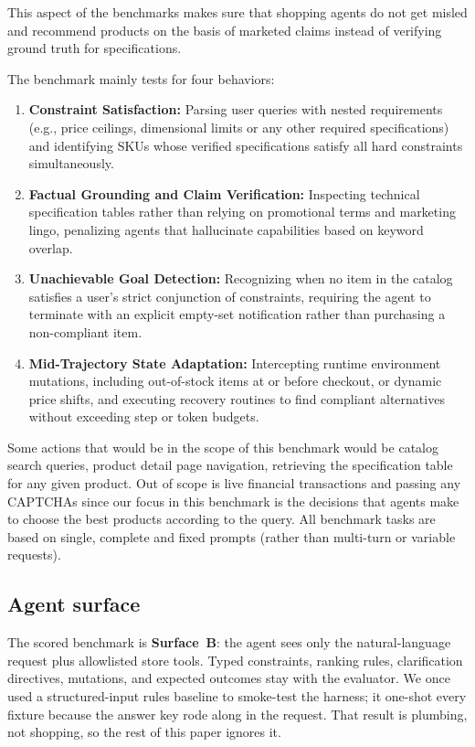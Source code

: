 \documentclass{article} %
\begin{document}
This aspect of the benchmarks makes sure that shopping agents do not get misled and recommend products on the basis of marketed claims instead of verifying ground truth for specifications. 

The benchmark mainly tests for four behaviors: 
\begin{enumerate}[leftmargin=*,noitemsep,topsep=0pt]
    \item \textbf{Constraint Satisfaction:} Parsing user queries with nested requirements (e.g., price ceilings, dimensional limits or any other required specifications) and identifying SKUs whose verified specifications satisfy all hard constraints simultaneously.
    \item \textbf{Factual Grounding and Claim Verification:} Inspecting technical specification tables rather than relying on promotional terms and marketing lingo, penalizing agents that hallucinate capabilities based on keyword overlap.
    \item \textbf{Unachievable Goal Detection:} Recognizing when no item in the catalog satisfies a user's strict conjunction of constraints, requiring the agent to terminate with an explicit empty-set notification rather than purchasing a non-compliant item.
    \item \textbf{Mid-Trajectory State Adaptation:} Intercepting runtime environment mutations, including out-of-stock items at or before checkout, or dynamic price shifts, and executing recovery routines to find compliant alternatives without exceeding step or token budgets.
\end{enumerate}

Some actions that would be in the scope of this benchmark would be catalog search queries, product detail page navigation, retrieving the specification table for any given product. Out of scope is live financial transactions and passing any CAPTCHAs since our focus in this benchmark is the decisions that agents make to choose the best products according to the query. All benchmark tasks are based on single, complete and fixed prompts (rather than multi-turn or variable requests).

\subsection{Agent surface}

The scored benchmark is \textbf{Surface~B}: the agent sees only the natural-language request plus allowlisted store tools. Typed constraints, ranking rules, clarification directives, mutations, and expected outcomes stay with the evaluator. We once used a structured-input rules baseline to smoke-test the harness; it one-shot every fixture because the answer key rode along in the request. That result is plumbing, not shopping, so the rest of this paper ignores it.
\end{document}
